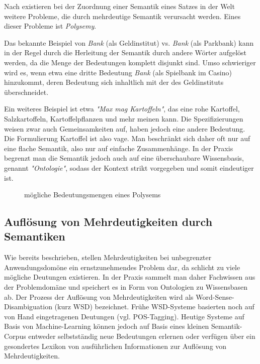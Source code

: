 \documentclass[12pt]{report}
\begin{document}
Nach \cite{car52} existieren bei der Zuordnung einer Semantik eines Satzes in der Welt weitere Probleme, die durch mehrdeutige Semantik verursacht werden. Eines dieser Probleme ist \textit{Polysemy}. 

Das bekannte Beispiel von \textit{Bank} (als Geldinstitut) vs. \textit{Bank} (als Parkbank) kann in der Regel durch die Herleitung der Semantik durch andere Wörter aufgelöst werden, da die Menge der Bedeutungen komplett disjunkt sind. Umso schwieriger wird es, wenn etwa eine dritte Bedeutung \textit{Bank} (als Spielbank im Casino) hinzukommt, deren Bedeutung sich inhaltlich mit der des Geldinstituts überschneidet. 

Ein weiteres Beispiel ist etwa \textit{"Max mag Kartoffeln"}, das eine rohe Kartoffel, Salzkartoffeln, Kartoffelpflanzen und mehr meinen kann. Die Spezifizierungen weisen zwar auch Gemeinsamkeiten auf, haben jedoch eine andere Bedeutung. Die Formulierung Kartoffel ist also vage.
Man beschränkt sich daher oft nur auf eine flache Semantik, also nur auf einfache Zusammenhänge. In der Praxis begrenzt man die Semantik jedoch auch auf eine überschaubare Wissensbasis, genannt \textit{"Ontologie"}, sodass der Kontext strikt vorgegeben und somit eindeutiger ist.

\begin{figure}
\caption{mögliche Bedeutungsmengen eines Polysems}
\end{figure}

\subsection{Auflösung von Mehrdeutigkeiten durch Semantiken}
Wie bereits beschrieben, stellen Mehrdeutigkeiten bei unbegrenzter Anwendungsdomöne ein ernstzunehmendes Problem dar, da schlicht zu viele mögliche Deutungen existieren. In der Praxis sammelt man daher Fachwissen aus der Problemdomäne und speichert es in Form von Ontologien zu Wissensbasen ab. Der Prozess der Auflösung von Mehrdeutigkeiten wird als Word-Sense-Disambiguation (kurz WSD) bezeichnet. Frühe WSD-Systeme basierten noch auf von Hand eingetragenen Deutungen (vgl. POS-Tagging). Heutige Systeme auf Basis von Machine-Learning können jedoch auf Basis eines kleinen Semantik-Corpus entweder selbstständig neue Bedeutungen erlernen oder verfügen über ein gesondertes Lexikon von ausführlichen Informationen zur Auflösung von Mehrdeutigkeiten. 
\end{document}
